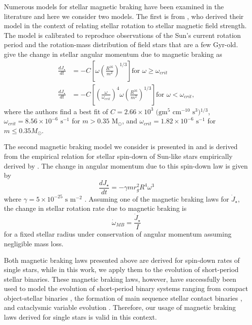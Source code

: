 Numerous models for stellar magnetic braking have been examined in the literature and here we consider two models.  The first is from \citet{Reiners2012}, who derived their model in the context of relating stellar rotation to stellar magnetic field strength.  The model is calibrated to reproduce observations of the Sun's current rotation period and the rotation-mass distribution of field stars that are a few Gyr-old.  \citet{Reiners2012} give the change in stellar angular momentum due to magnetic braking as
\begin{equation} \label{eqn:ang_mom_loss_reiners}
\begin{split}
\frac{dJ_{\star}}{dt} & = -C \left[ \omega \left(\frac{R^{16}}{m^2} \right)^{1/3} \right] \text{for $\omega \geq \omega_{crit}$} \\
\frac{dJ_{\star}}{dt} & = -C \left[ \left( \frac{\omega}{\omega_{crit}} \right)^4 \omega \left(\frac{R^{16}}{m^2} \right)^{1/3} \right] \text{for $\omega < \omega_{crit}$},
\end{split}
\end{equation}
where the authors find a best fit of $C = 2.66 \times 10^3 \text{ (gm$^5$ cm$^{-10}$ s$^3$)$^{1/3}$}$, $\omega_{crit} = 8.56 \times 10^{-6}\text{ s$^{-1}$}$ for $m > 0.35$ M$_{\odot}$, and $\omega_{crit} = 1.82 \times 10^{-6} \text{ s$^{-1}$}$ for $m \leq 0.35 M_{\odot}$.

The second magnetic braking model we consider is presented in \citet{Repetto2014} and is derived from the empirical relation for stellar spin-down of Sun-like stars empirically derived by \citet{Skumanich1972}.  The change in angular momentum due to this spin-down law is given by
\begin{equation} \label{eqn:ang_mom_loss_skumanich}
\frac{dJ_{\star}}{dt} = - \gamma m r_g^2 R^4 \omega^3
\end{equation}
where $\gamma = 5 \times 10^{-25} \text{ s m}^{-2}$ \citep{Repetto2014}.  Assuming one of the magnetic braking laws for $\dot{J}_{\star}$, the change in stellar rotation rate due to magnetic braking is
\begin{equation} \label{eqn:rot_rate_dt}
\dot{\omega}_{MB} = \frac{\dot{J}_{\star}}{I}
\end{equation}
for a fixed stellar radius under conservation of angular momentum assuming negligible mass loss.  

Both magnetic braking laws presented above are derived for spin-down rates of single stars, while in this work, we apply them to the evolution of short-period stellar binaries.  These magnetic braking laws, however, have successfully been used to model the evolution of short-period binary systems ranging from compact object-stellar binaries \citep[e.g.][]{Verbunt1981,Repetto2014}, the formation of main sequence stellar contact binaries \citep[e.g.][]{Stepien1995,Andronov2006}, and cataclysmic variable evolution \citep[e.g.][]{Ivanova2003}.  Therefore, our usage of magnetic braking laws derived for single stars is valid in this context.

